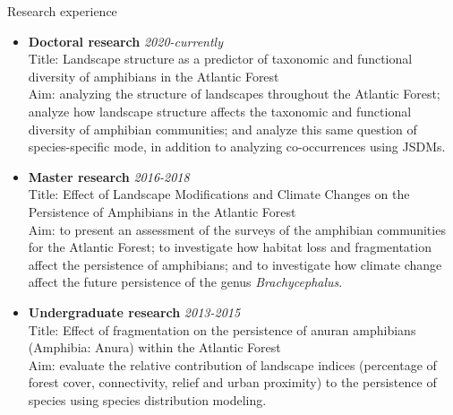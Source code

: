 \documentclass{resume}
\begin{document}
\begin{rSection}{Research experience}
\begin{itemize}
\item {\bf Doctoral research} \hfill{\em 2020-currently} 
\\ Title: Landscape structure as a predictor of taxonomic and functional diversity of amphibians in the Atlantic Forest 
\\ Aim: analyzing the structure of landscapes throughout the Atlantic Forest; analyze how landscape structure affects the taxonomic and functional diversity of amphibian communities; and analyze this same question of species-specific mode, in addition to analyzing co-occurrences using JSDMs.

\item {\bf Master research} \hfill{\em 2016-2018} 
\\ Title: Effect of Landscape Modifications and Climate Changes on the Persistence of Amphibians in the Atlantic Forest 
\\ Aim: to present an assessment of the surveys of the amphibian communities for the Atlantic Forest; to investigate how habitat loss and fragmentation affect the persistence of amphibians; and to investigate how climate change affect the future persistence of the genus {\it Brachycephalus}.

\item {\bf Undergraduate research} \hfill{\em 2013-2015} 
\\ Title: Effect of fragmentation on the persistence of anuran amphibians (Amphibia: Anura) within the Atlantic Forest 
\\ Aim: evaluate the relative contribution of landscape indices (percentage of forest cover, connectivity, relief and urban proximity) to the persistence of species using species distribution modeling.
\end{itemize}
\end{rSection}

\end{document}
